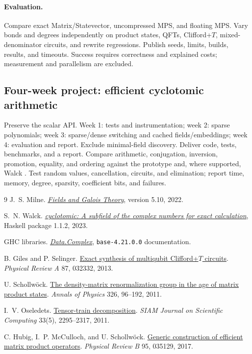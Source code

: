 \documentclass[11pt,a4paper]{article}
\newcommand{\code}[1]{\texttt{#1}}
\begin{document}
\paragraph{Evaluation.}
Compare exact Matrix/Statevector, uncompressed MPS, and floating MPS.
Vary bonds and degrees independently on product states, QFTs, Clifford+$T$,
mixed-denominator circuits, and rewrite regressions. Publish seeds, limits,
builds, results, and timeouts. Success requires correctness and explained costs;
measurement and parallelism are excluded.

\subsection{Four-week project: efficient cyclotomic arithmetic}
\label{sec:scalarproject}
Preserve the scalar API. Week 1: tests and instrumentation; week 2: sparse
polynomials; week 3: sparse/dense switching and cached fields/embeddings;
week 4: evaluation and report. Exclude minimal-field discovery.
Deliver code, tests, benchmarks, and a report. Compare arithmetic, conjugation,
inversion, promotion, equality, and ordering against the prototype and, where
supported, Walck \cite{walck}. Test random values, cancellation, circuits, and
elimination; report time, memory, degree, sparsity, coefficient bits, and failures.

\begin{thebibliography}{9}
\enlargethispage{12pt}
\footnotesize
\setlength{\itemsep}{0pt}
\setlength{\parsep}{0pt}
\setlength{\parskip}{0pt}
J.~S. Milne. \href{https://www.jmilne.org/math/CourseNotes/FT.pdf}
{\emph{Fields and Galois Theory}}, version 5.10, 2022.

S.~N. Walck. \href{https://hackage.haskell.org/package/cyclotomic-1.1.2}
{\emph{cyclotomic: A subfield of the complex numbers for exact calculation}},
Haskell package 1.1.2, 2023.

GHC libraries. \href{https://hackage.haskell.org/package/base-4.21.0.0/docs/Data-Complex.html}
{\emph{Data.Complex}}, \code{base-4.21.0.0} documentation.

B. Giles and P. Selinger. \href{https://doi.org/10.1103/PhysRevA.87.032332}
{Exact synthesis of multiqubit Clifford+$T$ circuits}.
\emph{Physical Review A} 87, 032332, 2013.

U. Schollw\"ock. \href{https://doi.org/10.1016/j.aop.2010.09.012}
{The density-matrix renormalization group in the age of matrix product states}.
\emph{Annals of Physics} 326, 96--192, 2011.

I.~V. Oseledets. \href{https://doi.org/10.1137/090752286}{Tensor-train decomposition}.
\emph{SIAM Journal on Scientific Computing} 33(5), 2295--2317, 2011.

C. Hubig, I.~P. McCulloch, and U. Schollw\"ock.
\href{https://doi.org/10.1103/PhysRevB.95.035129}
{Generic construction of efficient matrix product operators}.
\emph{Physical Review B} 95, 035129, 2017.
\end{thebibliography}
\end{document}
